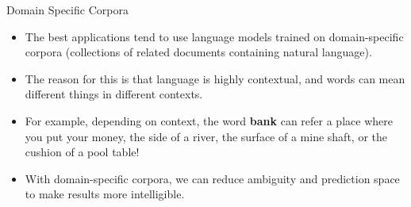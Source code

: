 \documentclass[11pt]{beamer}
\begin{document}
\begin{frame}{Domain Specific Corpora}
	\begin{itemize}
		\item  The best applications tend to use language models trained on domain-specific corpora (collections of related documents containing natural language). 
		\item The reason for this is that language is highly contextual, and words can mean different things in different contexts. 
		\item For example, depending on context, the word \textbf{bank} can refer a place where you put your money, the side of a river, the surface of a mine shaft, or the cushion of a pool table! 
		\item With domain-specific corpora, we can reduce ambiguity and prediction space to make results more intelligible.
	\end{itemize}
\end{frame}
\end{document}
